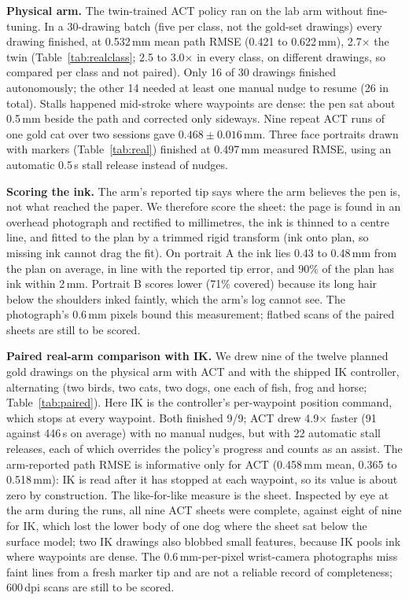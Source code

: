\documentclass[conference]{IEEEtran}
\newcommand{\mm}{\,mm\xspace}
\begin{document}
\textbf{Physical arm.} The twin-trained ACT policy ran on the lab arm without fine-tuning. In a 30-drawing batch
(five per class, not the gold-set drawings) every drawing finished, at 0.532\mm mean path RMSE
(0.421 to 0.622\mm), 2.7$\times$ the twin (Table~\ref{tab:realclass}; 2.5 to 3.0$\times$ in every class, on different drawings, so compared per class and not paired). Only 16 of 30 drawings finished
autonomously; the other 14 needed at least one manual nudge to resume (26 in total). Stalls happened mid-stroke where waypoints are dense: the pen
sat about 0.5\mm beside the path and corrected only sideways. Nine repeat ACT runs of one gold cat over two
sessions gave $0.468\pm0.016$\mm. Three face portraits drawn with markers
(Table~\ref{tab:real}) finished at 0.497\mm measured RMSE, using an automatic 0.5\,s stall release instead of
nudges.

\textbf{Scoring the ink.} The arm's reported tip says where the arm believes the pen is, not what reached the
paper. We therefore score the sheet: the page is found in an overhead photograph and rectified to millimetres, the
ink is thinned to a centre line, and fitted to the plan by a trimmed rigid transform (ink onto plan, so missing ink
cannot drag the fit). On portrait A the ink lies 0.43 to 0.48\mm from the plan on average, in line with the
reported tip error, and 90\% of the plan has ink within 2\mm. Portrait B scores lower (71\% covered) because its
long hair below the shoulders inked faintly, which the arm's log cannot see. The photograph's 0.6\mm pixels bound
this measurement; flatbed scans of the paired sheets are still to be scored.

\textbf{Paired real-arm comparison with IK.} We drew nine of the twelve planned gold drawings on the physical arm
with ACT and with the shipped IK controller, alternating (two birds, two cats, two dogs, one each of fish, frog and
horse; Table~\ref{tab:paired}). Here IK is the controller's per-waypoint position command, which stops at every
waypoint. Both finished 9/9; ACT drew 4.9$\times$ faster (91 against 446\,s on average) with no manual nudges,
but with 22 automatic stall releases, each of which overrides the policy's progress and counts as an assist. The arm-reported path RMSE is informative only for ACT (0.458\mm mean, 0.365 to
0.518\mm): IK is read after it has stopped at each waypoint, so its value is about zero by construction. The
like-for-like measure is the sheet. Inspected by eye at the arm during the runs, all nine ACT sheets were
complete, against eight of nine for IK, which lost the lower body of one dog where the sheet sat below the surface
model; two IK drawings also blobbed small features, because IK pools ink where waypoints are dense. The
0.6\mm-per-pixel wrist-camera photographs miss faint lines from a fresh marker tip and are not a reliable record
of completeness; 600\,dpi scans are still to be scored.
\end{document}
